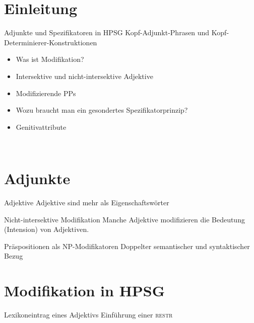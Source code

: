 \section{Einleitung}

\begin{frame}
  {Adjunkte und Spezifikatoren in HPSG}
  \onslide<+->
  \onslide<+->
  Kopf-Adjunkt-Phrasen und Kopf-Determinierer-Konstruktionen\\
  \Zeile
  \begin{itemize}[<+->]
    \item Was ist Modifikation?
    \item Intersektive und nicht-intersektive Adjektive
    \item Modifizierende PPs
    \item Wozu braucht man ein gesondertes Spezifikatorprinzip?
    \item Genitivattribute
  \end{itemize}
  \Zeile
  \onslide<+->
  \centering 
  \\
\end{frame}

\section{Adjunkte}

\begin{frame}
  {Adjektive}
  \onslide<+->
  \onslide<+->
  Adjektive sind mehr als \alert{Eigenschaftswörter}
\end{frame}

\begin{frame}
  {Nicht-intersektive Modifikation}
  \onslide<+->
  \onslide<+->
  Manche Adjektive modifizieren die Bedeutung (Intension) von Adjektiven.
\end{frame}

\begin{frame}
  {Präspositionen als NP-Modifikatoren}
  \onslide<+->
  \onslide<+->
  Doppelter semantischer und syntaktischer Bezug
\end{frame}


\section{Modifikation in HPSG}

\begin{frame}
  {Lexikoneintrag eines Adjektivs}
  \onslide<+->
  \onslide<+->
  Einführung einer \textsc{restr}
\end{frame}

